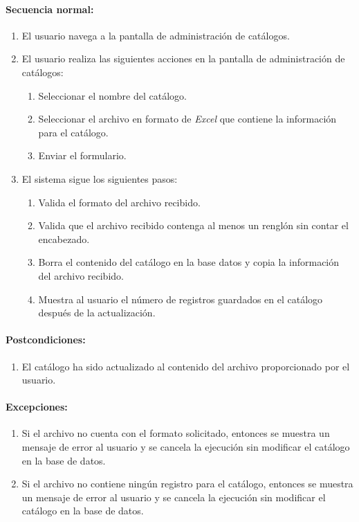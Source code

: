 \paragraph{Secuencia normal:}
\begin{enumerate}
  \item El usuario navega a la pantalla de administración de catálogos.
  \item El usuario realiza las siguientes acciones en la pantalla de administración de catálogos:
  \begin{enumerate}
    \item Seleccionar el nombre del catálogo.
    \item Seleccionar el archivo en formato de \textit{Excel}\textsuperscript{\textcopyright} que contiene la información para el catálogo.
    \item Enviar el formulario.
  \end{enumerate}
  \item El sistema sigue los siguientes pasos:
  \begin{enumerate}
    \item Valida el formato del archivo recibido.
    \item Valida que el archivo recibido contenga al menos un renglón sin contar el encabezado.
    \item Borra el contenido del catálogo en la base datos y copia la información del archivo recibido.
    \item Muestra al usuario el número de registros guardados en el catálogo después de la actualización.
  \end{enumerate}
\end{enumerate}
\paragraph{Postcondiciones:}
\begin{enumerate}
  \item El catálogo ha sido actualizado al contenido del archivo proporcionado por el usuario.
\end{enumerate}
\paragraph{Excepciones:}
\begin{enumerate}
  \item Si el archivo no cuenta con el formato solicitado, entonces se muestra un mensaje de error al usuario y se cancela la ejecución sin modificar el catálogo en la base de datos.
  \item Si el archivo no contiene ningún registro para el catálogo, entonces se muestra un mensaje de error al usuario y se cancela la ejecución sin modificar el catálogo en la base de datos.
\end{enumerate}


